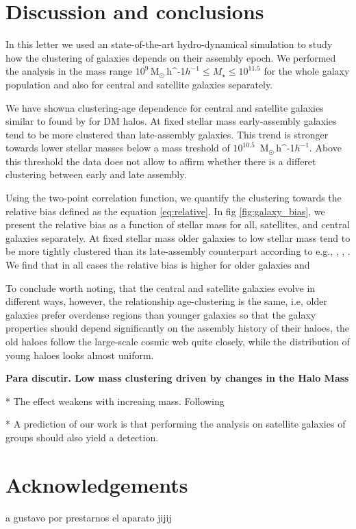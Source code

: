 \documentclass[fleqn,usenatbib]{mnras}
\newcommand{\Msunh}{\,{\rm M}$_{\odot}$\,\ifmmode h^{-1}\else $h^{-1}$\fi}
\begin{document}
\section{Discussion and conclusions}
\label{sec:conclu}

In this letter we used an state-of-the-art hydro-dynamical simulation
to study how the clustering of galaxies depends on their assembly
epoch.
We performed the analysis in the mass range $10^{9}$\Msunh $\leq
M_{\star} \leq 10^{11.5}$ for the whole galaxy population and also for 
central and satellite galaxies separately.

We have showna clustering-age  dependence for central and
satellite galaxies similar to found by \citet{2005MNRAS.363L..66G}
for DM halos. 
At fixed stellar mass early-assembly galaxies tend to be more
clustered than late-assembly galaxies.
This trend is stronger towards lower stellar masses below a mass
treshold of $10^{10.5}$
\Msunh. 
Above this threshold the data does not allow to affirm whether there
is a differet clustering between early and late assembly. 


Using the two-point correlation function, we quantify the clustering
towards the relative bias defined as the equation
\ref{eq:relative}. In fig \ref{fig:galaxy_bias}, we present the
relative bias as a function of stellar mass for all, satellites, and
central galaxies separately. At fixed stellar mass older galaxies to
low stellar mass tend to be more tightly clustered than its
late-assembly counterpart according to e.g., \citep{Lacerna_2014},
\citep{2013MNRAS.433..515W}, \citep{2009MNRAS.394.2229Z}. We find that
in all cases the relative bias is higher for older galaxies and 


To conclude worth noting, that the central and satellite galaxies
evolve in different ways, however, the relationship age-clustering is
the same, i.e, older galaxies prefer overdense regions than younger
galaxies so that the galaxy properties should depend significantly on
the assembly history of their haloes, the old haloes follow the
large-scale cosmic web quite closely, while the distribution of young
haloes looks almost uniform. 


\textbf{Para discutir. Low mass clustering driven by changes in the Halo Mass}

* The effect weakens with increaing mass. Following 

* A prediction of our work is that performing the analysis on
satellite galaxies of groups should also yield a detection.

\section*{Acknowledgements}

a gustavo por prestarnos el aparato jijij






\bsp	%
\label{lastpage}
\end{document}
